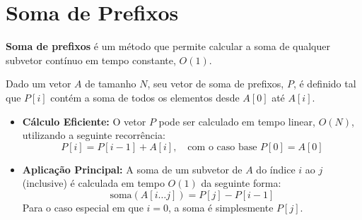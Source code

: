 \section*{Soma de Prefixos}

\textbf{Soma de prefixos} é um método que permite calcular a soma de qualquer subvetor contínuo em tempo constante, $O(1)$.

Dado um vetor $A$ de tamanho $N$, seu vetor de soma de prefixos, $P$, é definido tal que $P[i]$ contém a soma de todos os elementos desde $A[0]$ até $A[i]$.

\begin{itemize}
    
    \item \textbf{Cálculo Eficiente:} O vetor $P$ pode ser calculado em tempo linear, $O(N)$, utilizando a seguinte recorrência:
    $$ P[i] = P[i-1] + A[i], \quad \text{com o caso base } P[0] = A[0] $$

    \item \textbf{Aplicação Principal:} A soma de um subvetor de $A$ do índice $i$ ao $j$ (inclusive) é calculada em tempo $O(1)$ da seguinte forma:
    $$ \text{soma}(A[i \ldots j]) = P[j] - P[i-1] $$
    Para o caso especial em que $i=0$, a soma é simplesmente $P[j]$.
\end{itemize}
